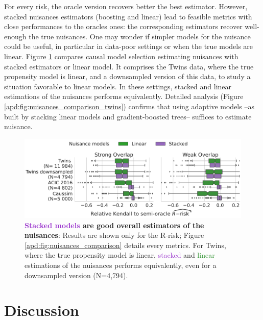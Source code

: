 \documentclass[10pt,twocolumn]{article}
\begin{document}
For every risk, the oracle version recovers better the best estimator.
However,
stacked nuisances estimators (boosting and linear) lead to feasible
metrics with close performances to the oracles ones: the
corresponding estimators recover well-enough the true nuisances.
One may wonder if simpler models for the nuisance could be useful,
in particular in data-poor settings or when the true models are linear.
Figure \ref{fig:all_datasets_nuisances_comparison} compares causal model
selection estimating nuisances with stacked estimators or linear model.
It comprises the Twins data, where the true propensity model is linear,
and a downsampled version of this data, to study a situation favorable to
linear models. In these settings,
stacked and linear estimations of the nuisances performs equivalently.
Detailed analysis (Figure \ref{apd:fig:nuisances_comparison_twins})
confirms that using adaptive models --as built by
stacking linear models and gradient-boosted trees-- suffices to estimate nuisance.

\begin{figure}[!tb]
    \includegraphics[width=\linewidth]{images/_4_nuisance_models_r_risk_only_3datasets_twocols.pdf}

    \caption{\textbf{\textcolor{DarkOrchid}{Stacked
                models} are good overall estimators of the nuisances}:
        Results are shown only for the
        R-risk; Figure \ref{apd:fig:nuisances_comparison}
        details every metrics. For Twins, where the true propensity
        model is linear, \textcolor{DarkOrchid}{stacked} and
        \textcolor{ForestGreen}{linear}
        estimations of the nuisances performs equivalently, even for a downsampled version
        (N=4,794). }\label{fig:all_datasets_nuisances_comparison}
\end{figure}

\section{Discussion}\label{sec:discussion}
\end{document}
